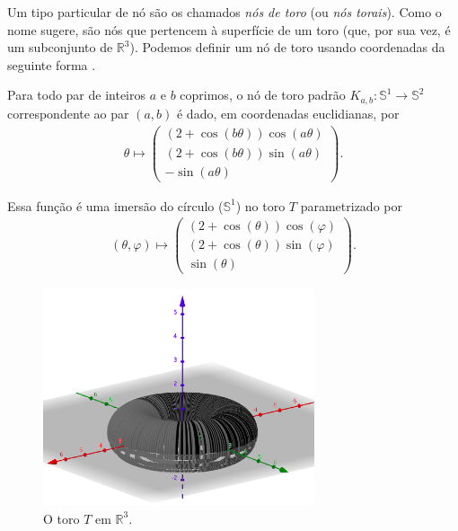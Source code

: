 	\par\vspace{0.3cm} Um tipo particular de nó são os chamados \textit{nós de toro} 
	(ou \textit{nós torais}). Como o nome sugere, são nós que pertencem à superfície 
	de um toro (que, por sua vez, é um subconjunto de $\mathbb{R}^3$). Podemos definir 
	um nó de toro usando coordenadas da seguinte forma \cite{no-toral}.
	\begin{definition}[Nó de toro]
	\label{def no de toro}
		Para todo par de inteiros $a$ e $b$ coprimos, o nó de toro padrão 
		$K_{a,b}: \mathbb{S}^1\to\mathbb{S}^2$ correspondente ao par $(a,b)$ é dado, em 
		coordenadas euclidianas, por 
		\begin{align*}
    		\theta\mapsto
    		\left( 
    		\begin{matrix}
    		(2+\cos(b\theta))\cos(a\theta) \\
    		(2+\cos(b\theta))\sin(a\theta) \\
    		-\sin(a\theta)
    		\end{matrix} 
    		\right).
		\end{align*}
	\end{definition}
	Essa função é uma imersão do círculo ($\mathbb{S}^1$) no toro $T$ parametrizado por
	\begin{align*}
    	(\theta, \varphi)\mapsto 
    	\left( \begin{matrix}
    	(2+\cos(\theta))\cos(\varphi) \\
    	(2+\cos(\theta))\sin(\varphi) \\
    	\sin(\theta)
    	\end{matrix}  \right).
	\end{align*}
	\begin{figure}[H]
		\begin{center}
			\includegraphics[width=8cm]{Images/toro.png}
		\end{center}\caption{O toro $T$ em $\mathbb{R}^3$.}\label{toro}
	\end{figure}
